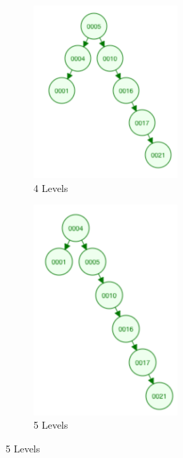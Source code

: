 \documentclass{article}
\begin{document}
\begin{enumerate}
\begin{figure}[h]
			\begin{subfigure}{0.6\textwidth}
				\centering
				\includegraphics[width=0.6\textwidth]{4level.png}
				\caption{4 Levels}
			\end{subfigure}
			\begin{subfigure}{0.6\textwidth}
				\centering
				\includegraphics[width=0.6\textwidth]{5level.png}
				\caption{5 Levels}
			\end{subfigure}
			

\end{figure}
\end{enumerate}
\end{document}
